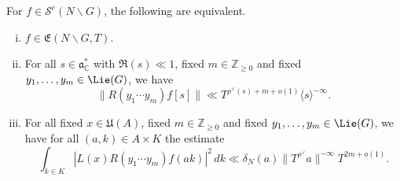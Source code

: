 \begin{lemma}\label{lem:standard:frakE-equivalences}
  For $f \in \mathcal{S}^e(N \backslash G)$, the following are equivalent.
  \begin{enumerate}[(i)]
  \item\label{itm:lemma-class-frak-E-basic:1} $f \in \mathfrak{E}(N \backslash G, T)$.
  \item\label{itm:lemma-class-frak-E-basic:2}  For all $s \in \mathfrak{a}_{\mathbb{C}}^*$ with $\Re(s) \ll 1$, fixed $m \in \mathbb{Z}_{\geq 0}$ and fixed $y_1,\dotsc,y_m \in \Lie(G)$, we have
    \begin{equation}\label{eq:x_1-dotsb-x_m}
      \|R(y_1 \dotsb y_m) f[s]\| \ll T^{\rho^\vee(s) + m + o(1)} \langle s \rangle^{-\infty}.
    \end{equation}
  \item\label{itm:lemma-class-frak-E-basic:3} For all fixed $x \in \mathfrak{U}(A)$, fixed $m \in \mathbb{Z}_{\geq 0}$ and fixed $y_1,\dotsc,y_m \in \Lie(G)$, we have for all $(a,k) \in A \times K$ the estimate
    \begin{equation}\label{eq:int-_k-in}
      \int_{k \in K}
      \left\lvert
        L(x) R(y_1 \dotsb y_m) f(a k)
      \right\rvert^2 \, d k
      \ll
      \delta_N(a)
      \|T^{\rho^\vee} a\|^{-\infty}
      T^{2 m + o(1)}.
    \end{equation}
  \end{enumerate}
\end{lemma}
